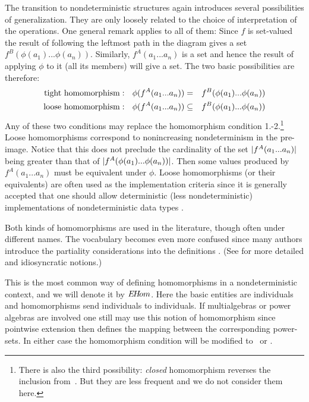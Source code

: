 \noindent
The transition to nondeterministic structures 
again introduces several possibilities of generalization. They are 
only loosely related to the choice of interpretation of the 
operations. One general remark applies to all of them: Since $f$
is set-valued the result of following the leftmost path in the 
diagram gives a set $f^{B}(\phi(a_1)...\phi(a_n))$. Similarly, 
$f^{A}(a_1...a_n)$ 
 is a set and hence the result of applying $\phi$ to it (all its members) 
will give a set. The two basic possibilities are therefore: 
\begin{eqnarray}
{\rm tight\ homomorphism}:\ \ \phi(f^{A}(a_1...a_n)) & = &
f^{B}(\phi(a_1)...\phi(a_n)) \label{eq:tight} 
\\ 
{\rm loose\ homomorphism}:\ \ \phi(f^{A}(a_1...a_n)) & 
\subseteq &  f^{B}(\phi(a_1)...\phi(a_n)) \label{eq:loose} 
\end{eqnarray}
Any of these two conditions may 
replace the homomorphism condition 1.-2.\footnote{There is also the 
third possibility: {\em closed} homomorphism reverses the inclusion 
from~. 
But they are less frequent and we do not consider them 
here.} Loose homomorphisms 
correspond to nonincreasing nondeterminism in the pre-image. Notice 
that this does not preclude the cardinality of the set 
$|f^{A}(a_1...a_n)|$
being greater than that of $|f^{A}(\phi(a_1)...\phi(a_n))|$. 
Then some values produced by $f^{A}(a_1...a_n)$
 must be equivalent under $\phi$. Loose homomorphisms (or their 
equivalents) are often used as the implementation criteria since it 
is generally accepted that one should allow deterministic (less 
nondeterministic) implementations of nondeterministic data types
\cite{c:121, c:64, c:94, c:53, c:132}.

Both 
kinds of homomorphisms are used in the literature, though often under 
different names. The vocabulary becomes even more confused since many 
authors introduce the partiality considerations into the definitions 
\cite{c:18, c:21, c:59}. (See \cite{c:21, c:93, c:94} for more detailed 
and idiosyncratic notions.)

This is the most common way of 
defining homomorphisms in a nondeterministic context, and we will 
denote it by $E\!H\!om$.
Here the basic entities are individuals and homomorphisms send 
individuals to
 individuals. If multialgebras or power algebras are involved one 
still may use this notion of homomorphism since pointwise extension 
then defines the mapping between the corresponding power-sets. In 
either case the homomorphism condition will be modified 
to~ or .

